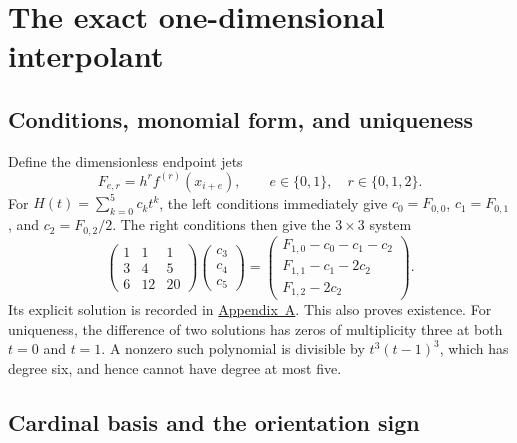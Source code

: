 \documentclass[11pt]{article}
\begin{document}
\section{The exact one-dimensional interpolant}
\label{sec:exact-1d}

\subsection{Conditions, monomial form, and uniqueness}

Define the dimensionless endpoint jets
\begin{equation}
  F_{e,r}=h^r f^{(r)}(x_{i+e}),
  \qquad e\in\{0,1\},\quad r\in\{0,1,2\}.
  \label{eq:normalized-jets}
\end{equation}
For $H(t)=\sum_{k=0}^{5}c_k t^k$, the left conditions immediately give
$c_0=F_{0,0}$, $c_1=F_{0,1}$, and $c_2=F_{0,2}/2$.  The right conditions
then give the $3\times3$ system
\begin{equation}
  \begin{pmatrix}
    1&1&1\\ 3&4&5\\ 6&12&20
  \end{pmatrix}
  \begin{pmatrix}c_3\\c_4\\c_5\end{pmatrix}
  =
  \begin{pmatrix}
    F_{1,0}-c_0-c_1-c_2\\
    F_{1,1}-c_1-2c_2\\
    F_{1,2}-2c_2
  \end{pmatrix}.
  \label{eq:monomial-system}
\end{equation}
Its explicit solution is recorded in \hyperref[app:formulas]{Appendix~A}.
This also proves existence.  For uniqueness, the difference of two solutions
has zeros of multiplicity three at both $t=0$ and $t=1$.  A nonzero such
polynomial is divisible by $t^3(t-1)^3$, which has degree six, and hence
cannot have degree at most five.

\subsection{Cardinal basis and the orientation sign}
\end{document}
